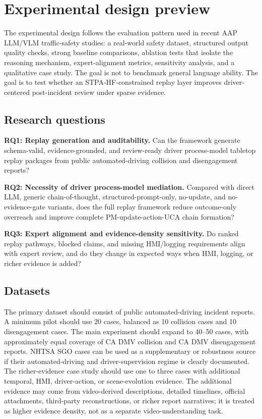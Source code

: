 \section{Experimental design preview}
\label{sec:experiments}

The experimental design follows the evaluation pattern used in recent AAP LLM/VLM traffic-safety studies: a real-world safety dataset, structured output quality checks, strong baseline comparisons, ablation tests that isolate the reasoning mechanism, expert-alignment metrics, sensitivity analysis, and a qualitative case study. The goal is not to benchmark general language ability. The goal is to test whether an STPA-HF-constrained replay layer improves driver-centered post-incident review under sparse evidence.

\subsection{Research questions}

\textbf{RQ1: Replay generation and auditability.} Can the framework generate schema-valid, evidence-grounded, and review-ready driver process-model tabletop replay packages from public automated-driving collision and disengagement reports?

\textbf{RQ2: Necessity of driver process-model mediation.} Compared with direct LLM, generic chain-of-thought, structured-prompt-only, no-update, and no-evidence-gate variants, does the full replay framework reduce outcome-only overreach and improve complete PM-update-action-UCA chain formation?

\textbf{RQ3: Expert alignment and evidence-density sensitivity.} Do ranked replay pathways, blocked claims, and missing HMI/logging requirements align with expert review, and do they change in expected ways when HMI, logging, or richer evidence is added?

\subsection{Datasets}

The primary dataset should consist of public automated-driving incident reports. A minimum pilot should use 20 cases, balanced as 10 collision cases and 10 disengagement cases. The main experiment should expand to 40--50 cases, with approximately equal coverage of CA DMV collision and CA DMV disengagement reports. NHTSA SGO cases can be used as a supplementary or robustness source if their automated-driving and driver-supervision regime is clearly documented. The richer-evidence case study should use one to three cases with additional temporal, HMI, driver-action, or scene-evolution evidence. The additional evidence may come from video-derived descriptions, detailed timelines, official attachments, third-party reconstructions, or richer report narratives; it is treated as higher evidence density, not as a separate video-understanding task.

